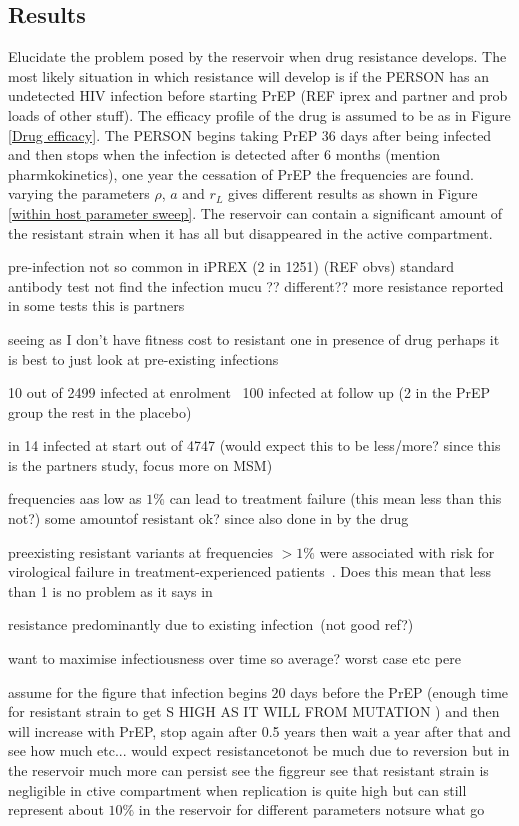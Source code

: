 \documentclass[DIV=15]{scrartcl}
\begin{document}
\subsection{Results}
Elucidate the problem posed by the reservoir when drug resistance develops. The  most likely situation in which resistance will develop is  if  the PERSON has an undetected HIV infection before starting PrEP (REF iprex and partner and prob loads of  other stuff). The efficacy profile of the drug is assumed to be as in Figure \ref{Drug efficacy}. The PERSON begins taking PrEP $36$ days after being infected and then stops when the infection is detected after $6$ months (mention pharmkokinetics), one year the cessation  of PrEP the frequencies are found. varying the parameters $\rho$, $a$ and $r_L$ 
gives different results as shown in Figure \ref{within host parameter sweep}. The reservoir can contain a significant amount of the resistant strain when it has all   but disappeared in the active compartment.





pre-infection not so common in iPREX (2 in 1251) (REF obvs) standard antibody test not find the infection 
mucu  ?? different??
more resistance reported in some tests \cite{lehman2015} this is partners 

seeing as I don't have fitness cost to resistant one in presence of drug perhaps it is best to just look at pre-existing infections

10 out of 2499 infected at enrolment~\cite{iprex2011}
100 infected at follow up (2 in the PrEP group the rest in the placebo)

in \cite{partners2012} 14 infected at start out of 4747 (would expect this to be less/more? since this is the partners study, focus more on MSM)

frequencies aas low as $1\%$ can lead to treatment failure (this mean less than this not?) some amountof resistant ok? since also done in by the drug

preexisting resistant
variants at frequencies $>1\%$ were associated with risk for virological
failure in treatment-experienced patients~\cite{boltz2011}. Does this mean that less than 1 is no problem as it says in~\cite{lehman2015}

resistance predominantly due to existing infection~\cite{lehman2015}(not good ref?)

want to maximise infectiousness over time so average?
worst case etc pere 

assume for the figure that infection begins 
$20$ days before the PrEP (enough time for resistant strain to get S HIGH AS IT WILL  FROM MUTATION 	)  and then will  increase with PrEP, stop again  after 0.5  years then wait a year after that and see how much etc...      would expect resistancetonot be much due to  reversion but in the reservoir much more can persist see the figgreur
see that resistant strain is negligible in ctive compartment when replication  is quite high but can still  represent about $10\%$ in the reservoir for different parameters notsure  what go 
\end{document}
